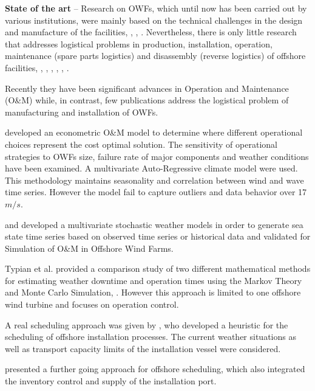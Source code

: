 \textbf{State of the art} --
Research on OWFs, which until now has been carried out by various institutions, were mainly based on the technical challenges in the design and manufacture of the facilities, \cite{Miller2013}, \cite{SerranoGonzalez2014}, \cite{Perveen2014}. Nevertheless, there is only little research that addresses logistical problems in production, installation, operation, maintenance (spare parts logistics) and disassembly (reverse logistics) of offshore facilities, \cite{Scholz2010}, \cite{Lange2012}, \cite{COMPIT11}, \cite{COMPIT12}, \cite{aitsimulation}, \cite{thalji2012}.

Recently they have been significant advances in Operation and Maintenance (O\&M) while, in contrast, few publications address the logistical problem of manufacturing and installation of OWFs.

\cite{dinwoodie2013} developed an econometric O\&M model to determine where different operational choices represent the cost optimal solution. The sensitivity of operational strategies to OWFs size, failure rate of major components and weather conditions have been examined. A multivariate Auto-Regressive climate model were used. This methodology maintains seasonality and correlation between wind and wave time series. However the model fail to capture outliers and data behavior over 17 $m/s$.


\cite{Hagen2013} and \cite{scheu2012} developed  a multivariate stochastic weather models in order to generate sea state time series based on observed time series or historical data and validated for Simulation of O\&M in Offshore Wind Farms. 


Typian et al. provided a comparison study of two different mathematical methods for estimating weather downtime and operation times using the Markov Theory and Monte Carlo Simulation, \cite{Tyapin2011}. However this approach is limited to one offshore wind turbine and focuses on operation control.




A real scheduling approach was given by \cite{Scholz2010}, who developed a heuristic for the scheduling of offshore installation processes. The current weather situations as well as transport capacity limits of the installation vessel were considered.



\cite{ISOPE2012} presented a further going approach for offshore scheduling, which also integrated the inventory control and supply of the installation port.




